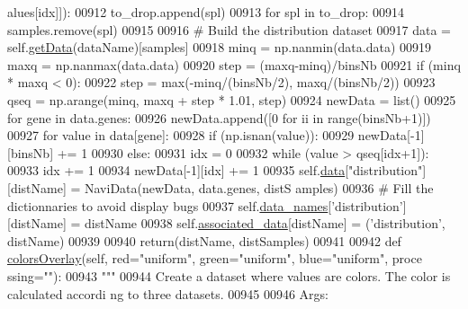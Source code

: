 \begin{DoxyCode}
      alues[idx]]):
00912                     to\_drop.append(spl)
00913             \textcolor{keywordflow}{for} spl \textcolor{keywordflow}{in} to\_drop:
00914                 samples.remove(spl)
00915 
00916         \textcolor{comment}{# Build the distribution dataset}
00917         data = self.\hyperlink{classnavicom_1_1navicom_1_1NaviCom_ad675e899836271ff4f2fd4bd17ea81d9}{getData}(dataName)[samples]
00918         minq = np.nanmin(data.data)
00919         maxq = np.nanmax(data.data)
00920         step = (maxq-minq)/binsNb
00921         \textcolor{keywordflow}{if} (minq * maxq < 0):
00922             step = max(-minq/(binsNb/2), maxq/(binsNb/2))
00923         qseq = np.arange(minq, maxq + step * 1.01, step)
00924         newData = list()
00925         \textcolor{keywordflow}{for} gene \textcolor{keywordflow}{in} data.genes:
00926             newData.append([0 \textcolor{keywordflow}{for} ii \textcolor{keywordflow}{in} range(binsNb+1)])
00927             \textcolor{keywordflow}{for} value \textcolor{keywordflow}{in} data[gene]:
00928                 \textcolor{keywordflow}{if} (np.isnan(value)):
00929                     newData[-1][binsNb] += 1
00930                 \textcolor{keywordflow}{else}:
00931                     idx = 0
00932                     \textcolor{keywordflow}{while} (value > qseq[idx+1]):
00933                         idx += 1
00934                     newData[-1][idx] += 1
00935         self.\hyperlink{classnavicom_1_1navicom_1_1NaviCom_aa1abff245573ed8406c6bddb4596f093}{data}[\textcolor{stringliteral}{"distribution"}][distName] = NaviData(newData, data.genes, distS
      amples)
00936         \textcolor{comment}{# Fill the dictionnaries to avoid display bugs}
00937         self.\hyperlink{classnavicom_1_1navicom_1_1NaviCom_a68646454fe1481b0065d2f43548319df}{data_names}[\textcolor{stringliteral}{'distribution'}][distName] = distName
00938         self.\hyperlink{classnavicom_1_1navicom_1_1NaviCom_a1d7072ae29e32d7ddd1da9cc5def7199}{associated_data}[distName] = (\textcolor{stringliteral}{'distribution'}, distName)
00939 
00940         \textcolor{keywordflow}{return}(distName, distSamples)
00941 
00942     \textcolor{keyword}{def }\hyperlink{classnavicom_1_1navicom_1_1NaviCom_a66a4bf5d38161f7ca29f030037b3565b}{colorsOverlay}(self, red="uniform", green="uniform", blue="uniform", proce
      ssing=""):
00943         \textcolor{stringliteral}{"""}
00944 \textcolor{stringliteral}{        Create a dataset where values are colors. The color is calculated accordi
      ng to three datasets.}
00945 \textcolor{stringliteral}{}
00946 \textcolor{stringliteral}{        Args:}

\end{DoxyCode}

